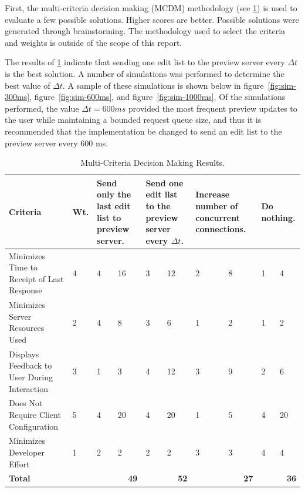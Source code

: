 \documentclass[se,resubmit]{uw-wkrpt}
\begin{document}
First, the multi-criteria decision making (MCDM) methodology (see
\ref{tbl:mcdm}) is used to evaluate a few possible solutions. Higher
scores are better. Possible solutions were generated through
brainstorming.  The methodology used to select the criteria and weights is
outside of the scope of this report.

The results of \ref{tbl:mcdm} indicate that sending one edit list to the
preview server every $\Delta t$ is the best solution. A number of
simulations was performed to determine the best value of $\Delta t$. A
sample of these simulations is shown below in figure~\ref{fig:sim-300ms},
figure~\ref{fig:sim-600ms}, and figure~\ref{fig:sim-1000ms}. Of the
simulations performed, the value $\Delta t=600 ms$ provided the most
frequent preview updates to the user while maintaining a bounded request
queue size, and thus it is recommended that the implementation be changed
to send an edit list to the preview server every 600 ms.

\begin{table}
  \caption{Multi-Criteria Decision Making Results.}
  \label{tbl:mcdm}
  \centering
  \begin{tabular}{|p{2.0cm}|p{1.0cm}|p{1.25cm}|p{1.25cm}|p{1.25cm}|p{1.25cm}|
                                     p{1.25cm}|p{1.25cm}|p{1.25cm}|p{1.25cm}|}
    \hline
    \textbf{Criteria} &
    \textbf{Wt.} &
    \multicolumn{2}{|p{2.5cm}|}{\textbf{Send only the last edit list to preview
    server.}} &
    \multicolumn{2}{|p{2.5cm}|}{\textbf{Send one edit list to the preview
    server every $\Delta t$.}} &
    \multicolumn{2}{|p{2.5cm}|}{\textbf{Increase number of concurrent
    connections.}} &
    \multicolumn{2}{|p{2.5cm}|}{\textbf{Do nothing.}} \\
    \hline\hline
    Minimizes Time to Receipt of Last Response &
       4 &  4 & 16 &  3 & 12 &  2 &  8 &  1 &  4 \\
    \hline
    Minimizes Server Resources Used &
       2 &  4 &  8 &  3 &  6 &  1 &  2 &  1 &  2 \\
    \hline
    Displays Feedback to User During Interaction &
       3 &  1 &  3 &  4 & 12 &  3 &  9 &  2 &  6 \\
    \hline
    Does Not Require Client Configuration &
       5 &  4 & 20 &  4 & 20 &  1 &  5 &  4 & 20 \\
    \hline
    Minimizes Developer Effort &
       1 &  2 &  2 &  2 &  2 &  3 &  3 &  4 &  4 \\
    \hline
    \hline
    \textbf{Total} &
      &
      \multicolumn{2}{|r|}{\textbf{49}} &
      \multicolumn{2}{|r|}{\textbf{52}} &
      \multicolumn{2}{|r|}{\textbf{27}} &
      \multicolumn{2}{|r|}{\textbf{36}} \\
    \hline
  \end{tabular}
\end{table}
\end{document}
